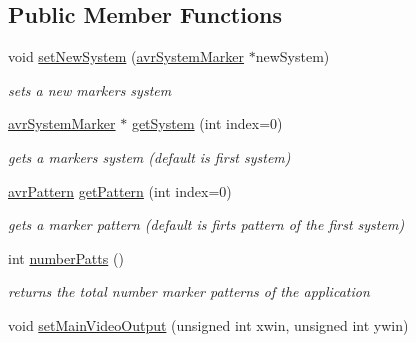 \subsection*{Public Member Functions}
\begin{DoxyCompactItemize}
\item 
\hypertarget{classavr_application_adbbf1bd55fd50ee3056d72a37800fd01}{void \hyperlink{classavr_application_adbbf1bd55fd50ee3056d72a37800fd01}{set\-New\-System} (\hyperlink{classavr_system_marker}{avr\-System\-Marker} $\ast$new\-System)}\label{classavr_application_adbbf1bd55fd50ee3056d72a37800fd01}

\begin{DoxyCompactList}\small\item\em sets a new markers system \end{DoxyCompactList}\item 
\hypertarget{classavr_application_a107ebe731d1d60bff93c1c54b66c5791}{\hyperlink{classavr_system_marker}{avr\-System\-Marker} $\ast$ \hyperlink{classavr_application_a107ebe731d1d60bff93c1c54b66c5791}{get\-System} (int index=0)}\label{classavr_application_a107ebe731d1d60bff93c1c54b66c5791}

\begin{DoxyCompactList}\small\item\em gets a markers system (default is first system) \end{DoxyCompactList}\item 
\hypertarget{classavr_application_a8f042f746899835204930bff38ad8ecd}{\hyperlink{classavr_pattern}{avr\-Pattern} \hyperlink{classavr_application_a8f042f746899835204930bff38ad8ecd}{get\-Pattern} (int index=0)}\label{classavr_application_a8f042f746899835204930bff38ad8ecd}

\begin{DoxyCompactList}\small\item\em gets a marker pattern (default is firts pattern of the first system) \end{DoxyCompactList}\item 
\hypertarget{classavr_application_a6bb369dd9daf3ad30d5aad4808bdcd06}{int \hyperlink{classavr_application_a6bb369dd9daf3ad30d5aad4808bdcd06}{number\-Patts} ()}\label{classavr_application_a6bb369dd9daf3ad30d5aad4808bdcd06}

\begin{DoxyCompactList}\small\item\em returns the total number marker patterns of the application \end{DoxyCompactList}\item 
\hypertarget{classavr_application_a6d101b2dd2ec280cea6e4110dfcfabe3}{void \hyperlink{classavr_application_a6d101b2dd2ec280cea6e4110dfcfabe3}{set\-Main\-Video\-Output} (unsigned int xwin, unsigned int ywin)}\label{classavr_application_a6d101b2dd2ec280cea6e4110dfcfabe3}


\end{DoxyCompactItemize}
